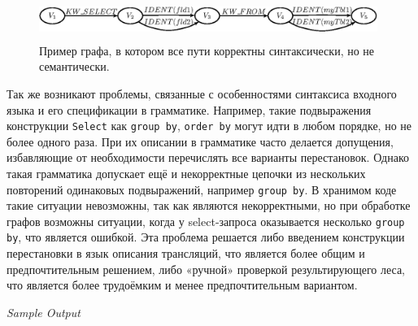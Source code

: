 \documentclass{llncs}
\begin{document}
\begin{figure}
    \begin{center}
        \includegraphics[width=11cm,height=1.3cm]{graphs/semantics_example.eps}
        \caption{ Пример графа, в котором все пути корректны синтаксически, но не семантически.}
        \label{pic7}
    \end{center}
\end{figure}

Так же возникают проблемы, связанные с особенностями синтаксиса входного языка и его спецификации в грамматике. Например, такие подвыражения конструкции \verb|Select| как \verb|group by|, \verb|order by| могут идти в любом порядке, но не более одного раза. При их описании в грамматике часто делается допущения, избавляющие от необходимости перечислять все варианты перестановок. Однако такая грамматика допускает ещё и некорректные цепочки из нескольких повторений одинаковых подвыражений, например \verb|group by|. В хранимом коде такие ситуации невозможны, так как являются некорректными, но при обработке  графов возможны ситуации, когда у select-запроса оказывается несколько \verb|group by|, что является ошибкой. Эта проблема решается либо введением конструкции перестановки в язык описания трансляций, что является более общим и предпочтительным решением, либо «ручной» проверкой результирующего леса, что является более трудоёмким и менее предпочтительным вариантом.

{\itshape Sample Output}
\bibauthoryear
%
\end{document}
